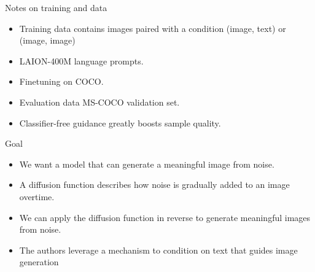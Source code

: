 \documentclass[8pt]{beamer}
\begin{document}
\begin{frame}{Notes on training and data}
    \begin{itemize}
        \item Training data contains images paired with a condition (image, text) or (image, image)
        \item LAION-400M language prompts.
        \item Finetuning on COCO.
        \item Evaluation data MS-COCO validation set.
        \item Classifier-free guidance greatly boosts sample quality.
    \end{itemize}
\end{frame}



\begin{frame}{Goal}
    \begin{itemize}
        \item We want a model that can generate a meaningful image from noise.
        \item A diffusion function describes how noise is gradually added to an image overtime.
        \item We can apply the diffusion function in reverse to generate meaningful images from noise.
        \item The authors leverage a mechanism to condition on text that guides image generation
    \end{itemize}
\end{frame}
\end{document}
